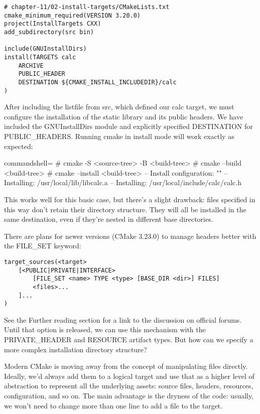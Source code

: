 \begin{lstlisting}[style=styleCMake]
# chapter-11/02-install-targets/CMakeLists.txt
cmake_minimum_required(VERSION 3.20.0)
project(InstallTargets CXX)
add_subdirectory(src bin)

include(GNUInstallDirs)
install(TARGETS calc
	ARCHIVE
	PUBLIC_HEADER
	DESTINATION ${CMAKE_INSTALL_INCLUDEDIR}/calc
)
\end{lstlisting}

After including the listfile from src, which defined our calc target, we must configure the installation of the static library and its public headers. We have included the GNUInstallDirs module and explicitly specified DESTINATION for PUBLIC\_HEADERS. Running cmake in install mode will work exactly as expected:

\begin{tcblisting}{commandshell={}}
# cmake -S <source-tree> -B <build-tree>
# cmake --build <build-tree>
# cmake --install <build-tree>
-- Install configuration: ""
-- Installing: /usr/local/lib/libcalc.a
-- Installing: /usr/local/include/calc/calc.h
\end{tcblisting}

This works well for this basic case, but there's a slight drawback: files specified in this way don't retain their directory structure. They will all be installed in the same destination, even if they're nested in different base directories.

There are plans for newer versions (CMake 3.23.0) to manage headers better with the FILE\_SET keyword:

\begin{lstlisting}[style=styleCMake]
target_sources(<target>
	[<PUBLIC|PRIVATE|INTERFACE>
		[FILE_SET <name> TYPE <type> [BASE_DIR <dir>] FILES]
		<files>...
	]...
)
\end{lstlisting}

See the Further reading section for a link to the discussion on official forums. Until that option is released, we can use this mechanism with the PRIVATE\_HEADER and RESOURCE artifact types. But how can we specify a more complex installation directory structure?


Modern CMake is moving away from the concept of manipulating files directly. Ideally, we'd always add them to a logical target and use that as a higher level of abstraction to represent all the underlying assets: source files, headers, resources, configuration, and so on. The main advantage is the dryness of the code: usually, we won't need to change more than one line to add a file to the target.

